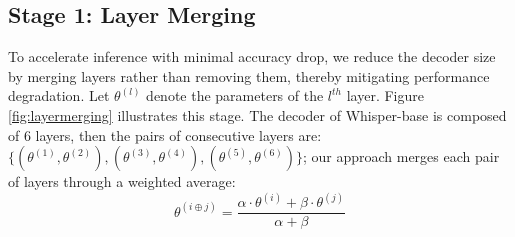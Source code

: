 \documentclass{article}
\begin{document}
\subsection{Stage 1: Layer Merging}
To accelerate inference with minimal accuracy drop, we reduce the decoder size by merging layers rather than removing them, thereby mitigating performance degradation. Let $\theta^{(l)}$ denote the parameters of the $l^{th}$ layer. Figure \ref{fig:layermerging} illustrates this stage. The decoder of Whisper-base is composed of 6 layers, then the pairs of consecutive layers are: $\{(\theta^{(1)}, \theta^{(2)}), (\theta^{(3)}, \theta^{(4)}), (\theta^{(5)}, \theta^{(6)})\}$; our approach merges each pair of layers through a weighted average:
\begin{equation}
\label{eq:merge}
\theta^{(i \oplus j)} = \frac{\alpha \cdot \theta^{(i)} + \beta \cdot \theta^{(j)}}{\alpha + \beta}
\end{equation}
\end{document}
